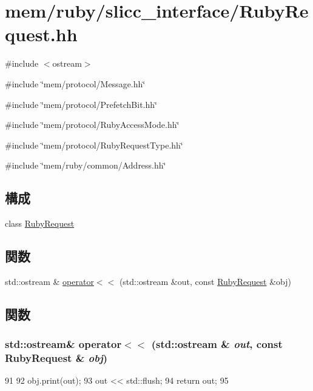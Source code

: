 \hypertarget{RubyRequest_8hh}{
\section{mem/ruby/slicc\_\-interface/RubyRequest.hh}
\label{RubyRequest_8hh}
}
{\ttfamily \#include $<$ostream$>$}\par
{\ttfamily \#include \char`\"{}mem/protocol/Message.hh\char`\"{}}\par
{\ttfamily \#include \char`\"{}mem/protocol/PrefetchBit.hh\char`\"{}}\par
{\ttfamily \#include \char`\"{}mem/protocol/RubyAccessMode.hh\char`\"{}}\par
{\ttfamily \#include \char`\"{}mem/protocol/RubyRequestType.hh\char`\"{}}\par
{\ttfamily \#include \char`\"{}mem/ruby/common/Address.hh\char`\"{}}\par
\subsection*{構成}
\begin{DoxyCompactItemize}
\item 
class \hyperlink{classRubyRequest}{RubyRequest}
\end{DoxyCompactItemize}
\subsection*{関数}
\begin{DoxyCompactItemize}
\item 
std::ostream \& \hyperlink{RubyRequest_8hh_aa3824b7c376697299604fa926157e9d5}{operator$<$$<$} (std::ostream \&out, const \hyperlink{classRubyRequest}{RubyRequest} \&obj)
\end{DoxyCompactItemize}


\subsection{関数}
\hypertarget{RubyRequest_8hh_aa3824b7c376697299604fa926157e9d5}{
\subsubsection[{operator$<$$<$}]{\setlength{\rightskip}{0pt plus 5cm}std::ostream\& operator$<$$<$ (std::ostream \& {\em out}, \/  const {\bf RubyRequest} \& {\em obj})}}
\label{RubyRequest_8hh_aa3824b7c376697299604fa926157e9d5}



\begin{DoxyCode}
91 {
92   obj.print(out);
93   out << std::flush;
94   return out;
95 }
\end{DoxyCode}
